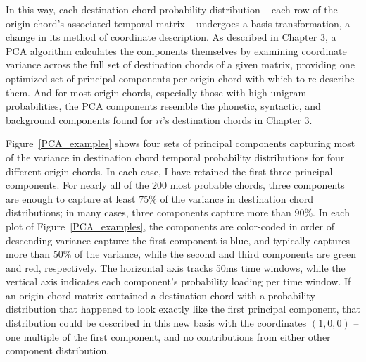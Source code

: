 In this way, each destination chord probability distribution -- each row of the origin chord's associated temporal matrix -- undergoes a basis transformation, a change in its method of coordinate description.  As described in Chapter 3, a PCA algorithm calculates the components themselves by examining coordinate variance across the full set of destination chords of a given matrix, providing one optimized set of principal components per origin chord with which to re-describe them.  And for most origin chords, especially those with high unigram probabilities, the PCA components resemble the phonetic, syntactic, and background components found for $ii$'s destination chords in Chapter 3.

Figure~\ref{PCA_examples} shows four sets of principal components capturing most of the variance in destination chord temporal probability distributions for four different origin chords.  In each case, I have retained the first three principal components.  For nearly all of the 200 most probable chords, three components are enough to capture at least 75\% of the variance in destination chord distributions; in many cases, three components capture more than 90\%.  In each plot of Figure~\ref{PCA_examples}, the components are color-coded in order of descending variance capture: the first component is blue, and typically captures more than 50\% of the variance, while the second and third components are green and red, respectively.  The horizontal axis tracks 50ms time windows, while the vertical axis indicates each component's probability loading per time window.  If an origin chord matrix contained a destination chord with a probability distribution that happened to look exactly like the first principal component, that distribution could be described in this new basis with the coordinates $(1,0,0)$ -- one multiple of the first component, and no contributions from either other component distribution.

